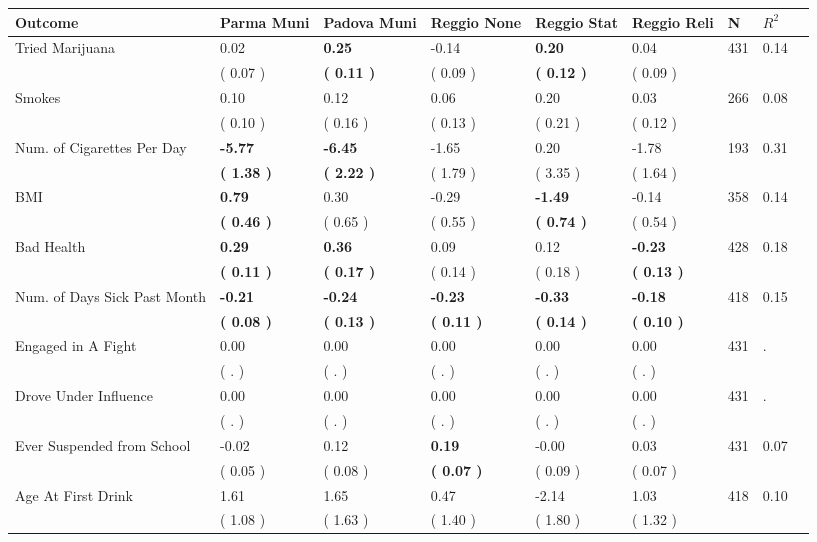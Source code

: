 \begin{tabular}{L{6.2cm} C{1.8cm} C{1.8cm} C{1.8cm} C{1.8cm} C{1.8cm} C{1.8cm} C{0.3cm} C{0.3cm}}
\toprule
 \textbf{Outcome} & \textbf{Parma Muni} & \textbf{Padova Muni} & \textbf{Reggio None} & \textbf{Reggio Stat} & \textbf{Reggio Reli} & \textbf{N} & \textbf{$ R^2$} \\
\midrule
Tried Marijuana &      0.02 & \textbf{     0.25} &     -0.14 & \textbf{     0.20} &      0.04  & 431 &       0.14 \\ 
 & (     0.07 ) & \textbf{(     0.11 )} & (     0.09 ) & \textbf{(     0.12 )} & (     0.09 )  & \\
Smokes &      0.10 &      0.12 &      0.06 &      0.20 &      0.03  & 266 &       0.08 \\ 
 & (     0.10 ) & (     0.16 ) & (     0.13 ) & (     0.21 ) & (     0.12 )  & \\
Num. of Cigarettes Per Day & \textbf{    -5.77} & \textbf{    -6.45} &     -1.65 &      0.20 &     -1.78  & 193 &       0.31 \\ 
 & \textbf{(     1.38 )} & \textbf{(     2.22 )} & (     1.79 ) & (     3.35 ) & (     1.64 )  & \\
BMI & \textbf{     0.79} &      0.30 &     -0.29 & \textbf{    -1.49} &     -0.14  & 358 &       0.14 \\ 
 & \textbf{(     0.46 )} & (     0.65 ) & (     0.55 ) & \textbf{(     0.74 )} & (     0.54 )  & \\
Bad Health & \textbf{     0.29} & \textbf{     0.36} &      0.09 &      0.12 & \textbf{    -0.23}  & 428 &       0.18 \\ 
 & \textbf{(     0.11 )} & \textbf{(     0.17 )} & (     0.14 ) & (     0.18 ) & \textbf{(     0.13 )}  & \\
Num. of Days Sick Past Month & \textbf{    -0.21} & \textbf{    -0.24} & \textbf{    -0.23} & \textbf{    -0.33} & \textbf{    -0.18}  & 418 &       0.15 \\ 
 & \textbf{(     0.08 )} & \textbf{(     0.13 )} & \textbf{(     0.11 )} & \textbf{(     0.14 )} & \textbf{(     0.10 )}  & \\
Engaged in A Fight &      0.00 &      0.00 &      0.00 &      0.00 &      0.00  & 431 &          . \\ 
 & (        . ) & (        . ) & (        . ) & (        . ) & (        . )  & \\
Drove Under Influence &      0.00 &      0.00 &      0.00 &      0.00 &      0.00  & 431 &          . \\ 
 & (        . ) & (        . ) & (        . ) & (        . ) & (        . )  & \\
Ever Suspended from School &     -0.02 &      0.12 & \textbf{     0.19} &     -0.00 &      0.03  & 431 &       0.07 \\ 
 & (     0.05 ) & (     0.08 ) & \textbf{(     0.07 )} & (     0.09 ) & (     0.07 )  & \\
Age At First Drink &      1.61 &      1.65 &      0.47 &     -2.14 &      1.03  & 418 &       0.10 \\ 
 & (     1.08 ) & (     1.63 ) & (     1.40 ) & (     1.80 ) & (     1.32 )  & \\
\bottomrule
\end{tabular}
